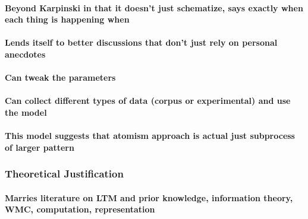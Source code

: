 \documentclass[]{book}
\let\oldparagraph\paragraph
\renewcommand{\paragraph}[1]{\oldparagraph{#1}\mbox{}}
\theoremstyle{definition}
\theoremstyle{definition}
\theoremstyle{definition}
\theoremstyle{remark}
\begin{document}
\hypertarget{beyond-karpinski-in-that-it-doesnt-just-schematize-says-exactly-when-each-thing-is-happening-when}{%
\paragraph{Beyond Karpinski in that it doesn't just schematize, says
exactly when each thing is happening
when}\label{beyond-karpinski-in-that-it-doesnt-just-schematize-says-exactly-when-each-thing-is-happening-when}}

\hypertarget{lends-itself-to-better-discussions-that-dont-just-rely-on-personal-anecdotes}{%
\paragraph{Lends itself to better discussions that don't just rely on
personal
anecdotes}\label{lends-itself-to-better-discussions-that-dont-just-rely-on-personal-anecdotes}}

\hypertarget{can-tweak-the-parameters}{%
\paragraph{Can tweak the parameters}\label{can-tweak-the-parameters}}

\hypertarget{can-collect-different-types-of-data-corpus-or-experimental-and-use-the-model}{%
\paragraph{Can collect different types of data (corpus or experimental)
and use the
model}\label{can-collect-different-types-of-data-corpus-or-experimental-and-use-the-model}}

\hypertarget{this-model-suggests-that-atomism-approach-is-actual-just-subprocess-of-larger-pattern}{%
\paragraph{This model suggests that atomism approach is actual just
subprocess of larger
pattern}\label{this-model-suggests-that-atomism-approach-is-actual-just-subprocess-of-larger-pattern}}

\hypertarget{theoretical-justification}{%
\subsubsection{Theoretical
Justification}\label{theoretical-justification}}

\hypertarget{marries-literature-on-ltm-and-prior-knowledge-information-theory-wmc-computation-representation}{%
\paragraph{Marries literature on LTM and prior knowledge, information
theory, WMC, computation,
representation}\label{marries-literature-on-ltm-and-prior-knowledge-information-theory-wmc-computation-representation}}
\end{document}
